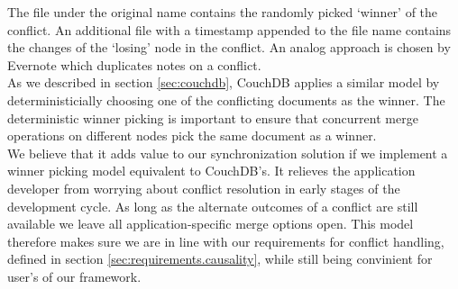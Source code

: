 The file under the original name contains the randomly picked `winner' of the conflict.
An additional file with a timestamp appended to the file name contains the changes of the `losing' node in the conflict.
An analog approach is chosen by Evernote which duplicates notes on a conflict.\\
As we described in section \ref{sec:couchdb}, CouchDB applies a similar model by deterministicially choosing one of the conflicting documents as the winner.
The deterministic winner picking is important to ensure that concurrent merge operations on different nodes pick the same document as a winner.\\
We believe that it adds value to our synchronization solution if we implement a winner picking model equivalent to CouchDB's.
It relieves the application developer from worrying about conflict resolution in early stages of the development cycle.
As long as the alternate outcomes of a conflict are still available we leave all application-specific merge options open.
This model therefore makes sure we are in line with our requirements for conflict handling, defined in section \ref{sec:requirements.causality}, while still being convinient for user's of our framework.

